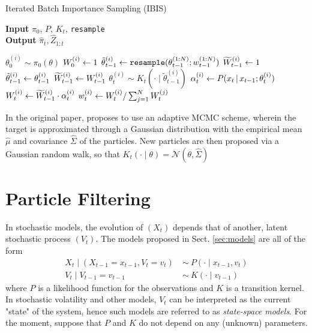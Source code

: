 \begin{algorithm}
\label{alg:IBIS}
\caption{Iterated Batch Importance Sampling (IBIS)}
\hspace*{\algorithmicindent} \textbf{Input} $\pi_0$, $P$, $K_t$, \texttt{resample} \\
\hspace*{\algorithmicindent} \textbf{Output} $\widehat{\pi}_t, \widehat{Z}_{1:t}$
\begin{algorithmic}
\State $\theta_0^{(i)} \sim \pi_0(\theta)$ 
\State $W_0^{(i)} \leftarrow 1$ 
	\If{$\ESS < \ESSmin$}
		\State $\tilde{\theta}_{t-1}^{(i)} \leftarrow \texttt{resample}(\theta_{t-1}^{(1:N)}; w_{t-1}^{(1:N)})$ 
		\State $\widetilde{W}_{t-1}^{(i)} \leftarrow 1$ 
	\Else
		\State $\tilde{\theta}_{t-1}^{(i)} \leftarrow \theta_{t-1}^{(i)}$ 
		\State $\widetilde{W}_{t-1}^{(i)} \leftarrow W_{t-1}^{(i)}$ 
	\EndIf
\State $\theta_t^{(i)} \sim K_t(\cdot \mid \widetilde{\theta}_{t-1}^{(i)})$ 
\State $\alpha_t^{(i)} \leftarrow P(x_t \,|\, x_{t-1}; \theta_t^{(i)})$ 
\State $W_t^{(i)} \leftarrow \widetilde{W}_{t-1}^{(i)} \cdot \alpha_t^{(i)}$ 
\State $w_t^{(i)} \leftarrow W_t^{(i)} / \sum_{j=1}^N W_t^{(j)}$ 
\EndFor
\end{algorithmic}
\end{algorithm}

In the original paper, \citeauthor{Chopin02} \citeyearpar{Chopin02} proposes to use an adaptive MCMC scheme, wherein the target is approximated through a Gaussian distribution with the empirical mean $\hat{\mu}$ and covariance $\widehat{\Sigma}$ of the particles. New particles are then proposed via a Gaussian random walk, so that $K_t(\cdot \mid \theta) = \mathcal{N}(\theta, \widehat{\Sigma})$


\section{Particle Filtering}

In stochastic models, the evolution of $(X_t)$ depends that of another, latent stochastic process $(V_t)$. The models proposed in Sect. \ref{sec:models} are all of the form
\begin{align*}
X_t \mid (X_{t-1}=x_{t-1}, V_t=v_t) ~ &\sim ~ P(\cdot \mid x_{t-1}, v_t) \\
V_t \mid V_{t-1}=v_{t-1} ~ &\sim ~ K(\cdot \mid v_{t-1})	
\end{align*}
where $P$ is a likelihood function for the observations and $K$ is a transition kernel. In stochastic volatility and other models, $V_t$ can be interpreted as the current "state" of the system, hence such models are referred to as \emph{state-space models}. For the moment, suppose that $P$ and $K$ do not depend on any (unknown) parameters.

